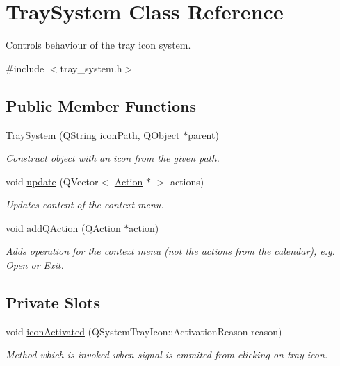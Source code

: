 \hypertarget{class_tray_system}{\section{Tray\-System Class Reference}
\label{class_tray_system}
}


Controls behaviour of the tray icon system.  




{\ttfamily \#include $<$tray\-\_\-system.\-h$>$}

\subsection*{Public Member Functions}
\begin{DoxyCompactItemize}
\item 
\hyperlink{class_tray_system_a58e46a8ba52b631347f8d467ec5f00f7}{Tray\-System} (Q\-String icon\-Path, Q\-Object $\ast$parent)
\begin{DoxyCompactList}\small\item\em Construct object with an icon from the given path. \end{DoxyCompactList}\item 
void \hyperlink{class_tray_system_a9b12345b605ba8414be9e1a85a791df8}{update} (Q\-Vector$<$ \hyperlink{class_action}{Action} $\ast$ $>$ actions)
\begin{DoxyCompactList}\small\item\em Updates content of the context menu. \end{DoxyCompactList}\item 
void \hyperlink{class_tray_system_a35163b0c36f1131988d74b77c8563aa1}{add\-Q\-Action} (Q\-Action $\ast$action)
\begin{DoxyCompactList}\small\item\em Adds operation for the context menu (not the actions from the calendar), e.\-g. Open or Exit. \end{DoxyCompactList}\end{DoxyCompactItemize}
\subsection*{Private Slots}
\begin{DoxyCompactItemize}
\item 
void \hyperlink{class_tray_system_a2971d243ae5826d61b21bdaee9e93d55}{icon\-Activated} (Q\-System\-Tray\-Icon\-::\-Activation\-Reason reason)
\begin{DoxyCompactList}\small\item\em Method which is invoked when signal is emmited from clicking on tray icon. \end{DoxyCompactList}\end{DoxyCompactItemize}
